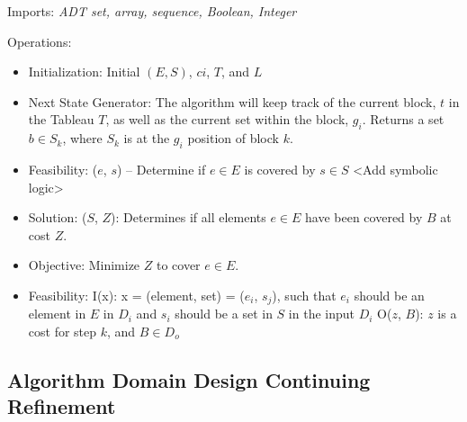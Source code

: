 \documentclass[12pt]{article}
\begin{document}
Imports: \textit{ADT set, array, sequence, Boolean, Integer}

Operations:
\begin{itemize}
	\item Initialization: Initial $(E, S)$, $ci$, $T$, and $L$
	\item Next State Generator: The algorithm will keep track of the current block, $t$ in the Tableau $T$, as well as the current set within the block, $g_i$. Returns a set $b \in S_k$, where $S_k$ is at the $g_i$ position of block $k$.
	\item Feasibility: ($e$, $s$) – Determine if $e \in E$ is covered by $s \in S$ <Add symbolic logic>
	\item Solution: ($S$, $Z$): Determines if all elements $e \in E$ have been covered by $B$ at cost $Z$.
	\item Objective: Minimize $Z$ to cover $e \in E$.
	\item Feasibility: I(x): x = (element, set) = ($e_i$, $s_j$), such that $e_i$ should be an element in $E$ in $D_i$ and $s_i$ should be a set in $S$ in the input $D_i$
O($z$, $B$): $z$ is a cost for step $k$, and $B \in D_o$
\end{itemize}
	
\subsection{Algorithm Domain Design Continuing Refinement}
\end{document}
